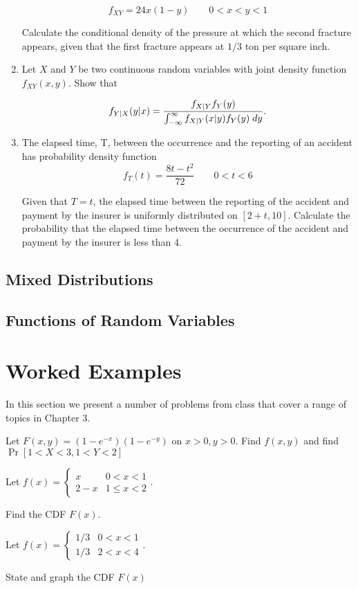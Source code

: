 \documentclass[../main.tex]{subfiles}
\begin{document}
\begin{exercises}
\begin{enumerate}
$$f_{XY}=24x(1-y) \qquad 0<x<y<1$$

Calculate the conditional density of the pressure at which the second fracture
appears, given that the first fracture appears at $1/3$ ton per square inch.


\item %
Let $X$ and $Y$ be two continuous random variables with joint density function
$f_{XY}(x,y)$. Show that

$$f_{Y|X}(y|x) = \dfrac{f_{X|Y}f_Y(y)}{\int_{-\infty}^{\infty}f_{X|Y}(x|y)f_Y(y)\;dy}.$$

\item %
The elapsed time, T, between the occurrence and the reporting of an accident
has probability density function
$$f_T(t) = \dfrac{8t-t^2}{72} \qquad 0<t<6$$

Given that $T = t$, the elapsed time between the reporting of the accident
and payment by the insurer is uniformly distributed on $[2 + t, 10]$.
Calculate the probability that the elapsed time between the occurrence of
the accident and payment by the insurer is less than 4.
\end{enumerate}
\end{exercises}

\subsection{Mixed Distributions}
\subsection{Functions of Random Variables}
\section{Worked Examples}
In this section we present a number of problems from class that cover a range of topics in Chapter 3.
\begin{example}
	Let $F(x,y) = (1-e^{-x})(1-e^{-y})$ on $x>0, y>0$. Find $f(x,y)$ and find 
	$\Pr[1<X<3, 1<Y<2]$
\end{example}
\begin{example}
	Let $f(x) = \begin{cases} x & 0<x<1 \\ 2-x & 1 \leq x < 2\end{cases}$. 
	
	Find the CDF $F(x)$.
\end{example}
\begin{example}
	Let $f(x) = \begin{cases}1/3 & 0<x<1 \\ 1/3 & 2<x<4 \end{cases}$.
	
	State and graph the CDF $F(x)$
\end{example}
\end{document}
